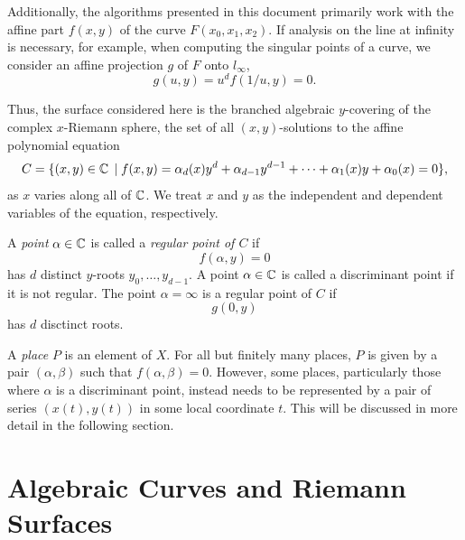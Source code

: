 Additionally, the algorithms presented in this document primarily work with the
affine part $f(x,y)$ of the curve $F(x_0,x_1,x_2)$. If analysis on the line at
infinity is necessary, for example, when computing the singular points of a
curve, we consider an affine projection $g$ of $F$ onto $l_\infty$,
\[
  g(u,y) = u^d f(1/u,y) = 0.
\]

Thus, the surface considered here is the branched algebraic $y$-covering of the
complex $x$-Riemann sphere, the set of all $(x,y)$-solutions to the affine
polynomial equation
\[
    C = \{ (x,y) \in \operatorname{\mathbb{C}} \; | \; f(x,y) = \alpha_d(x)y^d +
    \alpha_{d-1}y^{d-1} + \cdots + \alpha_1(x)y + \alpha_0(x) = 0\},
\]
as $x$ varies along all of $\operatorname{\mathbb{C}}$. We treat $x$ and $y$ as the independent and
dependent variables of the equation, respectively.

A {\it point} $\alpha \in \operatorname{\mathbb{C}}$ is called a {\it regular point of $C$} if
\[
  f(\alpha,y) = 0
\]
has $d$ distinct $y$-roots $y_0,\ldots,y_{d-1}$. A point $\alpha \in \operatorname{\mathbb{C}}$ is
called a discriminant point if it is not regular. The point $\alpha = \infty$ is
a regular point of $C$ if
\[
  g(0,y)
\]
has $d$ disctinct roots.

A {\it place} $P$ is an element of $X$. For all but finitely many places, $P$ is
given by a pair $(\alpha,\beta)$ such that $f(\alpha,\beta) = 0$. However, some
places, particularly those where $\alpha$ is a discriminant point, instead needs
to be represented by a pair of series $(x(t),y(t))$ in some local coordinate
$t$. This will be discussed in more detail in the following section.


\section{Algebraic Curves and Riemann
  Surfaces}\label{sec:background-algebraic-curves-and-riemann-surfaces}


